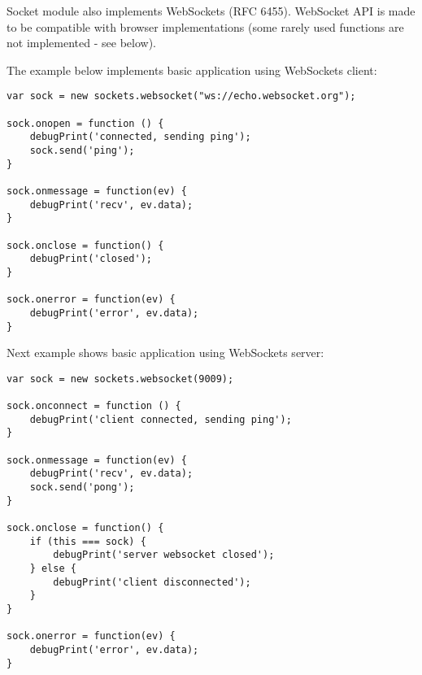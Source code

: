 Socket module also implements WebSockets (RFC 6455). WebSocket API is made to be
compatible with browser implementations (some rarely used functions are not
implemented - see below).

The example below implements basic application using WebSockets client:

\begin{lstlisting}[basicstyle=\small,columns=fullflexible]
var sock = new sockets.websocket("ws://echo.websocket.org");

sock.onopen = function () {
    debugPrint('connected, sending ping');
    sock.send('ping');
}

sock.onmessage = function(ev) {
    debugPrint('recv', ev.data);
}

sock.onclose = function() {
    debugPrint('closed');
}

sock.onerror = function(ev) {
    debugPrint('error', ev.data);
}
\end{lstlisting}

Next example shows basic application using WebSockets server:

\begin{lstlisting}[basicstyle=\small,columns=fullflexible]
var sock = new sockets.websocket(9009);

sock.onconnect = function () {
    debugPrint('client connected, sending ping');
}

sock.onmessage = function(ev) {
    debugPrint('recv', ev.data);
    sock.send('pong');
}

sock.onclose = function() {
    if (this === sock) {
        debugPrint('server websocket closed');
    } else {
        debugPrint('client disconnected');
    }
}

sock.onerror = function(ev) {
    debugPrint('error', ev.data);
}
\end{lstlisting}

